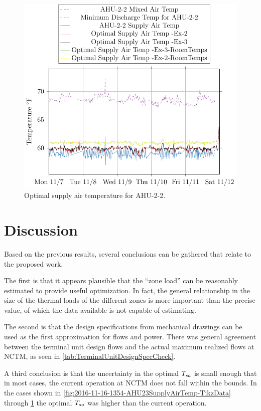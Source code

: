 \begin{figure}
\centering
\includegraphics[]{Plots/2016-11-16-1636-AHU22MixedAirTemp-TikzData.pdf}
\caption{Optimal supply air temperature for AHU-2-2.}
\label{fig:2016-11-16-1636-AHU22MixedAirTemp-TikzData}
\end{figure}

\section{Discussion}

Based on the previous results, several conclusions can be gathered that relate to the proposed work.

The first is that it appears plausible that the ``zone load'' can be reasonably estimated to provide useful optimization. In fact, the general relationship in the size of the thermal loads of the different zones is more important than the precise value, of which the data available is not capable of estimating. 

The second is that the design specifications from mechanical drawings can be used as the first approximation for flows and power. There was general agreement between the terminal unit design flows and the actual maximum realized flows at NCTM, as seen in \tableref{} \ref{tab:TerminalUnitDesignSpecCheck}. 

A third conclusion is that the uncertainty in the optimal \(T_{sa}\) is small enough that in most cases, the current operation at NCTM does not fall within the bounds.
In the cases shown in \figref{} \ref{fig:2016-11-16-1354-AHU23SupplyAirTemp-TikzData} through \figref{} \ref{fig:2016-11-16-1636-AHU22MixedAirTemp-TikzData} the optimal \(T_{sa}\) was higher than the current operation. 
